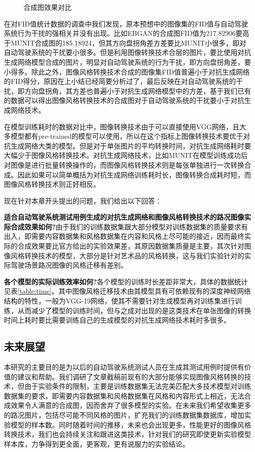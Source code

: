 \begin{figure}[h]
    \centering
    \caption{合成图效果对比}
    \label{fig:new}
\end{figure}

在对FID值统计数据的调查中我们发现，原本预想中的图像集的FID值与自动驾驶系统行为干扰的强相关并没有出现。比如EBGAN的合成图FID值为217.82906要高于MUNIT合成图的185.18924，但其方向盘拐角差方差要比MUNIT小很多，即对自动驾驶系统的干扰要小很多。但是利用图像转换技术合层的图片，要比使用对抗生成网络模型合成的图片，明显对自动驾驶系统的行为干扰，即方向盘拐角差，要小得多。除此之外，图像风格转换技术合成的图像集FID值普遍小于对抗生成网络的FID得分，原因在上小结已经简要分析过了，最后反映在对自动驾驶系统的干扰，即方向盘拐角，其方差也普遍小于对抗生成网络模型中的方差，基于我们已有的数据可以得出图像风格转换技术的合成图对于自动驾驶系统的干扰要小于对抗生成网络技术。

在模型训练耗时的数据对比中，图像转换技术由于可以直接使用VGG网络，且大多模型都有pre-trained的模型可以使用，所以在这个指标上图像转换技术要优于对抗生成网络大类的模型。但是对于单张图片的平均转换时间，对抗生成网络耗时要大幅少于图像风格转换技术。对抗生成网络技术，比如MUNIT在模型训练成功后对图像是进行批量转换操作的，而图像风格转换技术则是每张单独进行一次转换合成。因此如果可以简单概括为对抗生成网络训练耗时长，图像转换合成耗时短，而图像风格转换技术则正好相反。

现在针对本章开头提出的问题，我们给出以下回答：

\textbf{适合自动驾驶系统测试用例生成的对抗生成网络和图像风格转换技术的路况图像实际合成效果如何?}\quad 由于我们的训练数据集跟大部分模型对训练数据集的质量要求有出入，即需要内容数据集和风格数据集在内容和风格上尽可能的接近，因而最终实际的合成效果要比官方给出的实验效果差，其原因数据集质量是主要，其次针对图像风格转换技术的模型，大部分是针对艺术品的风格转换，这与我们实验针对的实际驾驶场景路况图像的风格迁移有差别。

\textbf{各个模型的实际训练效率如何?}\quad 各个模型的训练时长差距非常大，具体的数据统计见表\ref{table:time}。其中图像风格迁移技术由其模型具有可依赖现有的深度神经网络结构的特性，一般为VGG-19网络，使其不需要针对生成模型再对训练集进行训练，从而减少了模型的训练时间，但与之成对出现的是这类技术在单张图像的转换时间上耗时要比需要训练自己的生成模型的对抗生成网络技术耗时多很多。

\subsection{未来展望}

本研究的主要目的是为以后的自动驾驶系统测试人员在生成其测试用例时提供有价值的建议和帮助。我们调研了文章截稿前现有的大部分能够实现图像风格转换的技术，但由于实验条件的限制，主要是训练数据集无法完美匹配大多技术模型对训练数据集的要求，即需要内容数据集和风格数据集在风格和内容形式上相近，无法合成效果令人满意的合成图，因而舍弃了很多模型的实验。在未来我们希望收集更多的路况图片，包括尽可能不同风格的图片，扩充我们的训练数据集数据库，增加实验模型的样本数。同时随着时间的推移，未来也会出现更多，性能更好的图像风格转换技术，我们也会持续关注和跟进这类技术，针对我们的研究即使更新实验模型样本库，力争得到更全面，更客观，更有说服力的实验结论。
